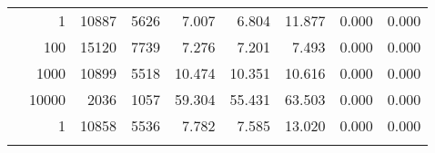 \begin{table}
\begin{tabular}{rrrrrrrrr}
	            
	        
				\noalign{\smallskip}\hline
				\multirow{ 4 }{*}{ 80000 } &
				
					
					 
					\multirow{ 1 }{*}{ 1 } &
					
						
							    
							     10887  & 5626  
	                           & 7.007 & 6.804 & 11.877
	                           & 0.000 & 0.000  \\
	                
	            
					 &  
					 
					\multirow{ 1 }{*}{ 100 } &
					
						
							    
							     15120  & 7739  
	                           & 7.276 & 7.201 & 7.493
	                           & 0.000 & 0.000  \\
	                
	            
					 &  
					 
					\multirow{ 1 }{*}{ 1000 } &
					
						
							    
							     10899  & 5518  
	                           & 10.474 & 10.351 & 10.616
	                           & 0.000 & 0.000  \\
	                
	            
					 &  
					 
					\multirow{ 1 }{*}{ 10000 } &
					
						
							    
							     2036  & 1057  
	                           & 59.304 & 55.431 & 63.503
	                           & 0.000 & 0.000  \\
	                
	            
	        
				\noalign{\smallskip}\hline
				\multirow{ 4 }{*}{ 160000 } &
				
					
					 
					\multirow{ 1 }{*}{ 1 } &
					
						
							    
							     10858  & 5536  
	                           & 7.782 & 7.585 & 13.020
	                           & 0.000 & 0.000  \\
	                
	            
					 &  
					 

\end{tabular}
\end{table}
